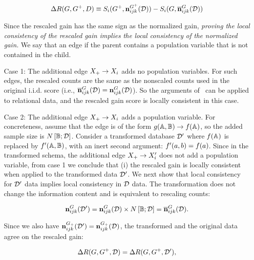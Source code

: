 \documentclass{article}
\begin{document}
\begin{equation}
\label{eq:rescale}
\Delta R(G,G^{+},D) \equiv S_{i}(G^{+},\boldsymbol{\mathrm{n}}^{G^{+}}_{ijk}(\mathcal{D})) - S_{i}(G,\overline{\boldsymbol{\mathrm{n}}}^{G}_{ijk}(\mathcal{D}))
\end{equation}


Since the rescaled gain has the same sign as the normalized gain, {\em proving the local consistency of the rescaled gain implies the local consistency of the normalized gain.}
We say that an edge  if the parent contains a population variable that is not contained in the child.

Case 1: The additional edge $X_{+} \rightarrow X_{i}$ adds no population variables. For such edges, the rescaled counts are the same as the nonscaled counts used in the original i.i.d. score (i.e., $\overline{\boldsymbol{\mathrm{n}}}^{G}_{ijk}(\mathcal{D}) = \boldsymbol{\mathrm{n}}^{G}_{ijk}(\mathcal{D})$). So the arguments of~\cite{Chickering2002} can be applied to relational data, and the rescaled gain score is locally consistent in this case. 


Case 2: The additional edge $X_{+} \rightarrow X_{i}$ adds a population variable. For concreteness, assume that the edge is of the form $g(\mathbb{A},\mathbb{B}) \rightarrow f(\mathbb{A})$, so the added sample size is $N\left[\mathbb{B};\mathcal{D}\right]$. Consider a transformed database $\mathcal{D}'$ where $f(\mathbb{A})$ is replaced by $f'(\mathbb{A},\mathbb{B})$, with an inert second argument: $f'(a,b) = f(a)$. Since in the transformed schema, the additional edge $X_{+} \rightarrow X'_{i}$ does not add a population variable, from case 1 we conclude that (i) the rescaled gain is locally consistent when applied to the transformed data $\mathcal{D}'$. We next show that local consistency for $\mathcal{D}'$ data implies local consistency in $\mathcal{D}$ data. The transformation does not change the information content and is equivalent to rescaling counts:

$$\boldsymbol{\mathrm{n}}^{G}_{ijk}(\mathcal{D}') = 
\boldsymbol{\mathrm{n}}^{G}_{ijk}(\mathcal{D}) \times N\left[\mathbb{B};\mathcal{D}\right] = \overline{\boldsymbol{\mathrm{n}}}^{G}_{ijk}(\mathcal{D}).$$ 

Since we also have $\boldsymbol{\mathrm{n}}^{G_{+}}_{ijk}(\mathcal{D}') = 
\boldsymbol{\mathrm{n}}^{G_{+}}_{ijk}(\mathcal{D})$, the transformed and the original data agree on the  rescaled gain:

\begin{equation} \label{eq:equiv-score}
\Delta R(G,G^{+},\mathcal{D}) = \Delta R(G,G^{+},\mathcal{D}'),
\end{equation}
\end{document}
